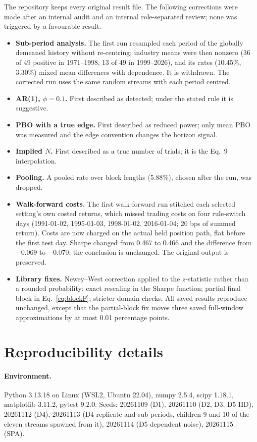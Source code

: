 \documentclass[11pt,a4paper]{article}
\theoremstyle{remark}
\begin{document}
The repository keeps every original result file. The following corrections were made after an internal audit and an internal role-separated review; none was triggered by a favourable result.
\begin{itemize}
\item \textbf{Sub-period analysis.} The first run resampled each period of the globally demeaned history without re-centring; industry means were then nonzero (36 of 49 positive in 1971--1998, 13 of 49 in 1999--2026), and its rates (10.45\%, 3.30\%) mixed mean differences with dependence. It is withdrawn. The corrected run uses the same random streams with each period centred.
\item \textbf{AR(1), $\phi=0.1$.} First described as detected; under the stated rule it is suggestive.
\item \textbf{PBO with a true edge.} First described as reduced power; only mean PBO was measured and the edge convention changes the horizon signal.
\item \textbf{Implied $N$.} First described as a true number of trials; it is the Eq.~9 interpolation.
\item \textbf{Pooling.} A pooled rate over block lengths (5.88\%), chosen after the run, was dropped.
\item \textbf{Walk-forward costs.} The first walk-forward run stitched each selected setting's own costed returns, which missed trading costs on four rule-switch days (1991-01-02, 1995-01-03, 1998-01-02, 2016-01-04; 20 bps of summed return). Costs are now charged on the actual held position path, flat before the first test day. Sharpe changed from 0.467 to 0.466 and the difference from $-0.069$ to $-0.070$; the conclusion is unchanged. The original output is preserved.
\item \textbf{Library fixes.} Newey--West correction applied to the $z$-statistic rather than a rounded probability; exact rescaling in the Sharpe function; partial final block in Eq.~\eqref{eq:blockF}; stricter domain checks. All saved results reproduce unchanged, except that the partial-block fix moves three saved full-window approximations by at most 0.01 percentage points.
\end{itemize}

\section{Reproducibility details}\label{app:repro}

\paragraph{Environment.} Python 3.13.18 on Linux (WSL2, Ubuntu 22.04), numpy 2.5.4, scipy 1.18.1, matplotlib 3.11.2, pytest 9.2.0. Seeds: 20261109 (D1), 20261110 (D2, D3, D5 IID), 20261112 (D4), 20261113 (D4 replicate and sub-periods, children 9 and 10 of the eleven streams spawned from it), 20261114 (D5 dependent noise), 20261115 (SPA).
\end{document}
